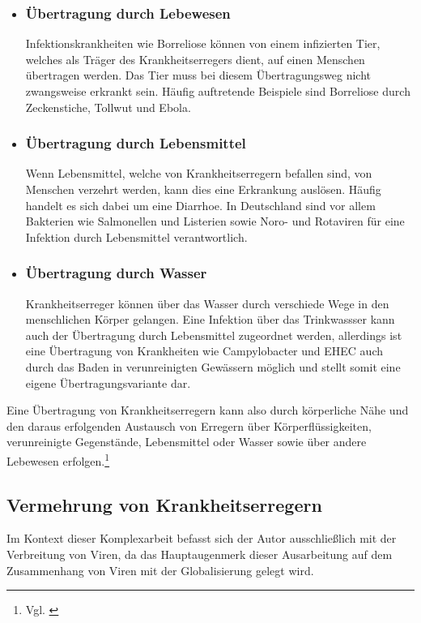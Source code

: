 \documentclass[12pt]{article}
\begin{document}
\begin{itemize}
    \item \subsubsection{Übertragung durch Lebewesen}
    Infektionskrankheiten wie Borreliose können von einem infizierten Tier, welches als Träger des Krankheitserregers dient, auf einen Menschen übertragen werden. Das Tier muss bei diesem Übertragungsweg nicht zwangsweise erkrankt sein. Häufig auftretende Beispiele sind Borreliose durch Zeckenstiche, Tollwut und Ebola.
    \item \subsubsection{Übertragung durch Lebensmittel}
    Wenn Lebensmittel, welche von Krankheitserregern befallen sind, von Menschen verzehrt werden, kann dies eine Erkrankung auslösen. Häufig handelt es sich dabei um eine Diarrhoe. In Deutschland sind vor allem Bakterien wie Salmonellen und Listerien sowie Noro- und Rotaviren für eine Infektion durch Lebensmittel verantwortlich.
    \item \subsubsection{Übertragung durch Wasser}
    Krankheitserreger können über das Wasser durch verschiede Wege in den menschlichen Körper gelangen. Eine Infektion über das Trinkwassser kann auch der Übertragung durch Lebensmittel zugeordnet werden, allerdings ist eine Übertragung von Krankheiten wie Campylobacter und EHEC auch durch das Baden in verunreinigten Gewässern möglich und stellt somit eine eigene Übertragungsvariante dar.
\end{itemize}
Eine Übertragung von Krankheitserregern kann also durch körperliche Nähe und den daraus erfolgenden Austausch von Erregern über Körperflüssigkeiten, verunreinigte Gegenstände, Lebensmittel oder Wasser sowie über andere Lebewesen erfolgen.\footnote{Vgl. \cite{über22}}
\subsection{Vermehrung von Krankheitserregern}
Im Kontext dieser Komplexarbeit befasst sich der Autor ausschließlich mit der Verbreitung von Viren, da das Hauptaugenmerk dieser Ausarbeitung auf dem Zusammenhang von Viren mit der Globalisierung gelegt wird.
\end{document}
